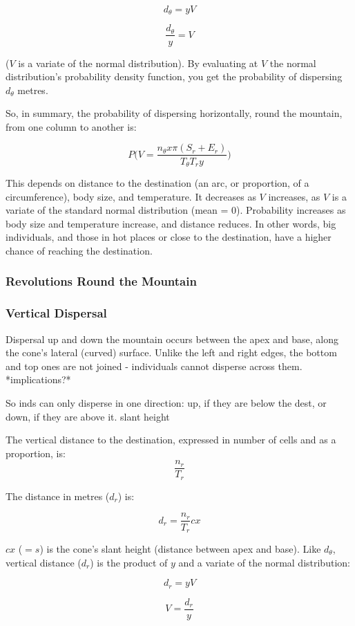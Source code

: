 \documentclass[11pt]{article}
\begin{document}
$$d_\theta = yV$$

$$\frac{d_\theta}{y} = V$$

($V$ is a variate of the normal distribution).
By evaluating at $V$ the normal distribution's probability density function, you get the probability of dispersing $d_\theta$ metres.

So, in summary, the probability of dispersing horizontally, round the mountain, from one column to another is:

$$P\Big(V = \frac{n_\theta x \pi (S_r + E_r)}{T_\theta T_r y}\Big)$$

This depends on distance to the destination (an arc, or proportion, of a circumference), body size, and temperature. It decreases as $V$ increases, as $V$ is a variate of the standard normal distribution (mean = 0). Probability increases as body size and temperature increase, and distance reduces. In other words, big individuals, and those in hot places or close to the destination, have a higher chance of reaching the destination.

\subsubsection{Revolutions Round the Mountain}

\subsubsection{Vertical Dispersal}
Dispersal up and down the mountain occurs between the apex and base, along the cone's lateral (curved) surface.
Unlike the left and right edges, the bottom and top ones are not joined - individuals cannot disperse across them. *implications?*

So inds can only disperse in one direction: up, if they are below the dest, or down, if they are above it.
slant height

The vertical distance to the destination, expressed in number of cells and as a proportion, is:
$$\frac{n_r}{T_r}$$

The distance in metres ($d_r$) is:

$$d_r = \frac{n_r}{T_r} cx$$

$cx$ ($= s$) is the cone's slant height (distance between apex and base). Like $d_\theta$, vertical distance ($d_r$) is the product of $y$ and a variate of the normal distribution:

$$d_r = yV$$

$$V = \frac{d_r}{y}$$
\end{document}
